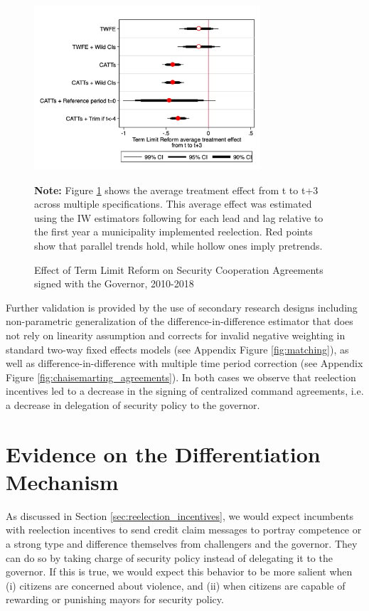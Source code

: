   
\begin{figure}[h]   
\centering
 \caption{Effect of Term Limit Reform on Security Cooperation Agreements signed with the Governor, 2010-2018}
 \label{fig:robustness_agreements}
\includegraphics[width=0.75\textwidth]{Figures/average_effects.png}
       \captionsetup{justification=centering}
       
 \textbf{Note:} Figure \ref{fig:robustness_agreements} shows the average treatment effect from t to t+3 across multiple specifications. This average effect was estimated using the IW estimators following \citet{abraham_sun_2020} for each lead and lag relative to the first year a municipality implemented reelection. Red points show that parallel trends hold, while hollow ones imply pretrends. 
\end{figure}   

Further validation is provided by the use of secondary research designs including \citet{imai_etal_2020} non-parametric generalization of the difference-in-difference estimator that does not rely on linearity assumption and corrects for invalid negative weighting in standard two-way fixed effects models (see Appendix Figure \ref{fig:matching}), as well as \citet{chaisemarting_etal_2019} difference-in-difference with multiple time period correction (see Appendix Figure \ref{fig:chaisemarting_agreements}). In both cases we observe that reelection incentives led to a decrease in the signing of centralized command agreements, i.e. a decrease in delegation of security policy to the governor.

\section{Evidence on the Differentiation Mechanism\label{sec:heterogeneous}}

As discussed in Section \ref{sec:reelection_incentives}, we would expect incumbents with reelection incentives to send credit claim messages to portray competence or a strong type and difference themselves from challengers and the governor. They can do so by taking charge of security policy instead of delegating it to the governor. If this is true, we would expect this behavior to be more salient when  (i) citizens are concerned about violence, and (ii) when citizens are capable of rewarding or punishing mayors for security policy. 

